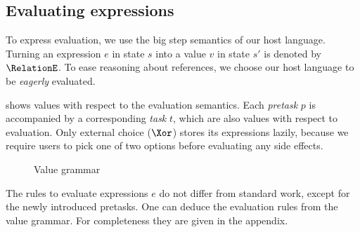 \subsection{Evaluating expressions}
\label{sec:evaluation}

To express evaluation,
we use the big step semantics of our host language.
Turning an expression $e$ in state $s$ into a value $v$ in state $s'$ is denoted by $\RelationE$.
To ease reasoning about references,
we choose our host language to be \emph{eagerly} evaluated.

 shows values with respect to the evaluation semantics.
Each \emph{pretask} $p$ is accompanied by a corresponding \emph{task} $t$,
which are also values with respect to evaluation.
Only external choice ($\Xor$) stores its expressions lazily,
because we require users to pick one of two options before evaluating any side effects.

\begin{figure}[h]
  \small
  \caption{Value grammar} \label{fig:value-grammar}
\end{figure}

The rules to evaluate expressions $e$ do not differ from standard work,
except for the newly introduced pretasks.
One can deduce the evaluation rules from the value grammar.
For completeness they are given in the appendix.




